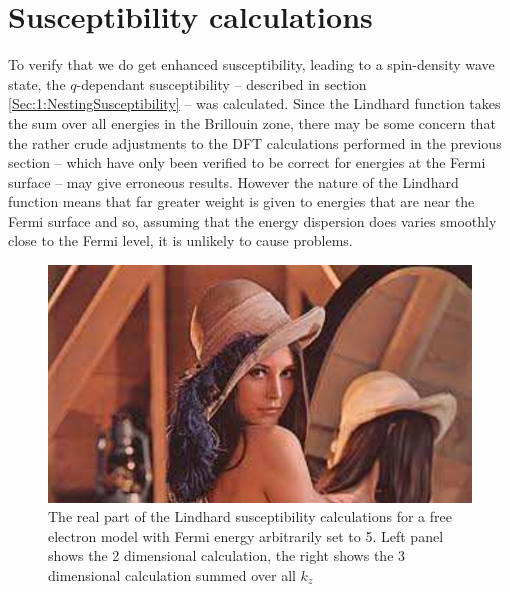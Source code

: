 
\section{Susceptibility calculations}
    \label{Sec:3:SubsceptibilityCalculation}


To verify that we do get enhanced susceptibility, leading to a spin-density wave state, the $q$-dependant susceptibility -- described in section \ref{Sec:1:NestingSusceptibility} -- was calculated. Since the Lindhard function takes the sum over all energies in the Brillouin zone, there may be some concern that the rather crude adjustments to the DFT calculations performed in the previous section -- which have only been verified to be correct for energies at the Fermi surface -- may give erroneous results. However the nature of the Lindhard function means that far greater weight is given to energies that are near the Fermi surface and so, assuming that the energy dispersion does varies smoothly close to the Fermi level, it is unlikely to cause problems.

\begin{figure}[h!]
    \begin{center}
        \includegraphics[scale=0.9]{Misc/TODO}
        \caption{The real part of the Lindhard susceptibility calculations for a free electron model with Fermi energy arbitrarily set to 5. Left panel shows the 2 dimensional calculation, the right shows the 3 dimensional calculation summed over all $k_z$}
        \label{Fig:3:FreeElectronSusceptibility}
    \end{center}
\end{figure}

